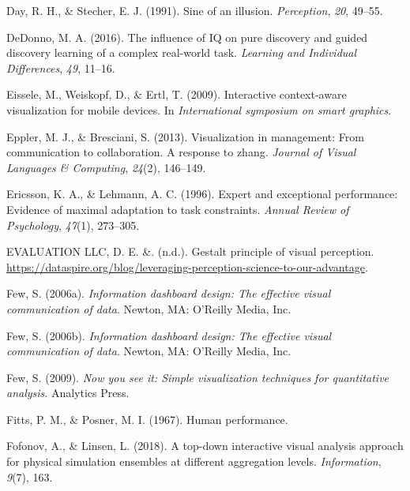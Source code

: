 \documentclass[print]{nuthesis}
\newlength{\cslhangindent}
\newenvironment{CSLReferences}[2]%
{\setlength{\parindent}{0pt}%
\everypar{\setlength{\hangindent}{\cslhangindent}}\ignorespaces}%
{\par}
\begin{document}
\begin{CSLReferences}{1}{0}
\leavevmode{}%
Day, R. H., \& Stecher, E. J. (1991). Sine of an illusion. \emph{Perception}, \emph{20}, 49--55.

\leavevmode{}%
DeDonno, M. A. (2016). The influence of IQ on pure discovery and guided discovery learning of a complex real-world task. \emph{Learning and Individual Differences}, \emph{49}, 11--16.

\leavevmode{}%
Eissele, M., Weiskopf, D., \& Ertl, T. (2009). Interactive context-aware visualization for mobile devices. In \emph{International symposium on smart graphics}.

\leavevmode{}%
Eppler, M. J., \& Bresciani, S. (2013). Visualization in management: From communication to collaboration. A response to zhang. \emph{Journal of Visual Languages \& Computing}, \emph{24}(2), 146--149.

\leavevmode{}%
Ericsson, K. A., \& Lehmann, A. C. (1996). Expert and exceptional performance: Evidence of maximal adaptation to task constraints. \emph{Annual Review of Psychology}, \emph{47}(1), 273--305.

\leavevmode{}%
EVALUATION LLC, D. E. \&. (n.d.). Gestalt principle of visual perception. \url{https://dataspire.org/blog/leveraging-perception-science-to-our-advantage}.

\leavevmode{}%
Few, S. (2006a). \emph{Information dashboard design: The effective visual communication of data}. Newton, MA: O'Reilly Media, Inc.

\leavevmode{}%
Few, S. (2006b). \emph{Information dashboard design: The effective visual communication of data}. Newton, MA: O'Reilly Media, Inc.

\leavevmode{}%
Few, S. (2009). \emph{Now you see it: Simple visualization techniques for quantitative analysis}. Analytics Press.

\leavevmode{}%
Fitts, P. M., \& Posner, M. I. (1967). Human performance.

\leavevmode{}%
Fofonov, A., \& Linsen, L. (2018). A top-down interactive visual analysis approach for physical simulation ensembles at different aggregation levels. \emph{Information}, \emph{9}(7), 163.


\end{CSLReferences}
\end{document}

